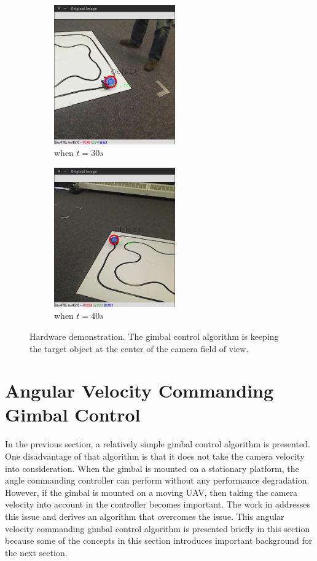 \begin{figure}[htbp]
\begin{subfigure}{0.5\textwidth}
		\centering
		\includegraphics[height=6cm]{images/chapter2/gimbal_30s.png}
		\caption{when $t=30s$}
	\end{subfigure}
	\begin{subfigure}{0.5\textwidth}
		\centering
		\includegraphics[height=6cm]{images/chapter2/gimbal_40s.png}
		\caption{when $t=40s$}
	\end{subfigure}	
	\caption{Hardware demonstration. The gimbal control algorithm is keeping the target object at the center of the camera field of view.}
	\label{gimbal_result}
\end{figure}


\section{Angular Velocity Commanding Gimbal Control}
In the previous section, a relatively simple gimbal control algorithm is presented. One disadvantage of that algorithm is that it does not take the camera velocity into consideration. When the gimbal is mounted on a stationary platform, the angle commanding controller can perform without any performance degradation. However, if the gimbal is mounted on a moving UAV, then taking the camera velocity into account in the controller becomes important. The work in \cite{Hurak2012} addresses this issue and derives an algorithm that overcomes the issue. This angular velocity commanding gimbal control algorithm is presented briefly in this section because some of the concepts in this section introduces important background for the next section. 

